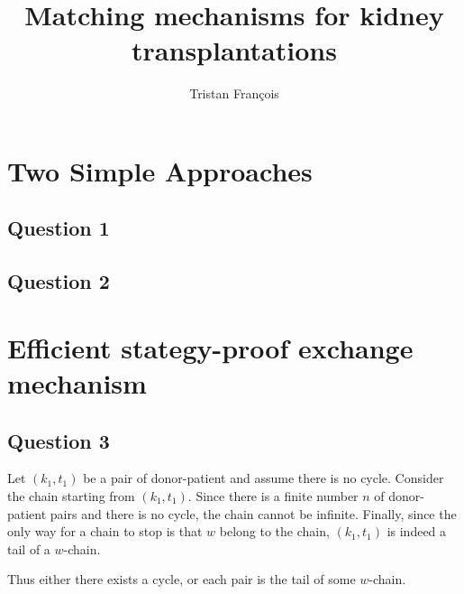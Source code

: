 \documentclass[english]{article}
\title{Matching mechanisms for kidney transplantations}
\author{Tristan François}
\begin{document}
\maketitle

\section{Two Simple Approaches}

\subsection*{Question 1}

\subsection*{Question 2}

\section{Efficient stategy-proof exchange mechanism}

\subsection*{Question 3}

Let $(k_1,t_1)$ be a pair of donor-patient and assume there is no cycle. Consider the chain starting from $(k_1,t_1)$. Since there is a finite number $n$ of donor-patient pairs and there is no cycle, the chain cannot be infinite. Finally, since the only way for a chain to stop is that $w$ belong to the chain, $(k_1,t_1)$ is indeed a tail of a $w$-chain.

Thus either there exists a cycle, or each pair is the tail of some $w$-chain.
\end{document}
